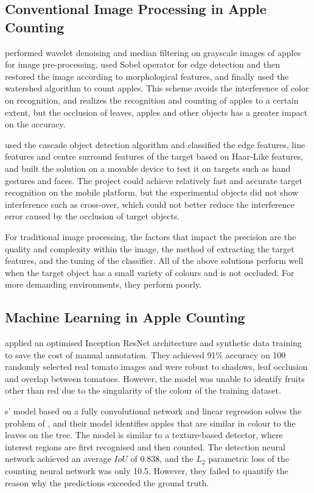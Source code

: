 \subsection{Conventional Image Processing in Apple Counting}
\cite{Qilemuge2018} performed wavelet denoising and median filtering on grayscale images of apples for image pre-processing, used Sobel operator for edge detection and then restored the image according to morphological features, and finally used the watershed algorithm to count apples. This scheme avoids the interference of color on recognition, and realizes the recognition and counting of apples to a certain extent, but the occlusion of leaves, apples and other objects has a greater impact on the accuracy. 

\cite{Guennouni2014} used the cascade object detection algorithm and classified the edge features, line features and centre surround features of the target based on Haar-Like features, and built the solution on a movable device to test it on targets such as hand gestures and faces. The project could achieve relatively fast and accurate target recognition on the mobile platform, but the experimental objects did not show interference such as cross-over, which could not better reduce the interference error caused by the occlusion of target objects. 

For traditional image processing, the factors that impact the precision are the quality and complexity within the image, the method of extracting the target features, and the tuning of the classifier. All of the above solutions perform well when the target object has a small variety of colours and is not occluded. For more demanding environments, they perform poorly.

\subsection{Machine Learning in Apple Counting}
\cite{Rahnemoonfar2017} applied an optimised Inception ResNet architecture and synthetic data training to save the cost of manual annotation. They achieved 91\% accuracy on 100 randomly selected real tomato images and were robust to shadows, leaf occlusion and overlap between tomatoes. However, the model was unable to identify fruits other than red due to the singularity of the colour of the training dataset. 

\cite{Chen2017}s' model based on a fully convolutional network and linear regression solves the problem of \cite{Rahnemoonfar2017}, and their model identifies apples that are similar in colour to the leaves on the tree. The model is similar to a texture-based detector, where interest regions are first recognised and then counted. The detection neural network achieved an average $IoU$ of 0.838, and the $L_2$ parametric loss of the counting neural network was only 10.5. However,  they failed to quantify the reason why the predictions exceeded the ground truth.

